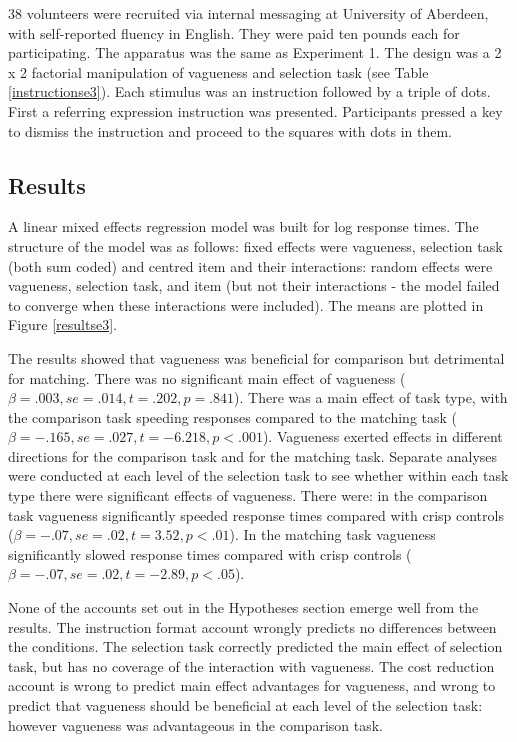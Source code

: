 38 volunteers were recruited via internal messaging at University of Aberdeen, with self-reported fluency in English. They were paid ten pounds each for participating.
The apparatus was the same as Experiment 1.
The design was a 2 x 2 factorial manipulation of vagueness and selection task (see Table \ref{instructionse3}).
Each stimulus was an instruction followed by a triple of dots.
First a referring expression instruction was presented. Participants pressed a key to dismiss the instruction and proceed to the squares with dots in them.

\subsection{Results}
A linear mixed effects regression model was built for log response times. The structure of the model was as follows: fixed effects were vagueness, selection task (both sum coded) and centred item and their interactions: random effects were vagueness, selection task, and item (but not their interactions - the model failed to converge when these interactions were included). The means are plotted in Figure \ref{resultse3}.

The results showed that vagueness was beneficial for comparison but detrimental for matching. There was no significant main effect of vagueness ($\beta =.003, se=.014, t=.202, p=.841$). There was a main effect of task type, with the comparison task speeding responses compared to the matching task ($\beta=-.165, se=.027, t=-6.218, p<.001$). Vagueness exerted effects in different directions for the comparison task and for the matching task. Separate analyses were conducted at each level of the selection task to see whether within each task type there were significant effects of vagueness. There were: in the comparison task vagueness significantly speeded response times compared with crisp controls ($\beta=-.07, se=.02, t=3.52, p<.01$). In the matching task vagueness significantly slowed response times compared with crisp controls ($\beta=-.07, se=.02, t=-2.89, p<.05$).

None of the accounts set out in the Hypotheses section emerge well from the results. The instruction format account wrongly predicts no differences between the conditions. The selection task correctly predicted the main effect of selection task, but has no coverage of the interaction with vagueness. The cost reduction account is wrong to predict main effect advantages for vagueness, and wrong to predict that vagueness should be beneficial at each level of the selection task: however vagueness was advantageous in the comparison task.


